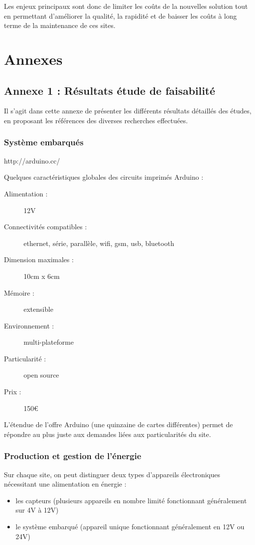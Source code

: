 \documentclass{mise_en_page}
\begin{document}
Les enjeux principaux sont donc de limiter les coûts de la nouvelles
solution tout en permettant d’améliorer la qualité, la rapidité et de
baisser les coûts à long terme de la maintenance de ces sites.




\section{Annexes}
\subsection{Annexe 1 : Résultats étude de faisabilité}
Il s’agit dans cette annexe de présenter les différents résultats
détaillés des études, en proposant les références des diverses
recherches effectuées.

\subsubsection{Système embarqués}
http://arduino.cc/

Quelques caractéristiques globales des circuits imprimés Arduino :

\begin{description}
\item[Alimentation :] 12V
\item[Connectivités compatibles :] ethernet, série, parallèle, wifi, gsm,
usb, bluetooth
\item[Dimension maximales :] 10cm x 6cm
\item[Mémoire :] extensible
\item[Environnement :] multi-plateforme
\item[Particularité :] open source
\item[Prix :] 150€
\end{description}



L’étendue de l’offre Arduino (une quinzaine de cartes différentes)
permet de répondre au plus juste aux demandes liées aux particularités
du site.

\subsubsection{Production et gestion de l’énergie}
Sur chaque site, on peut distinguer deux types d’appareils électroniques
nécessitant une alimentation en énergie :
\begin{itemize}
\item les capteurs (plusieurs appareils en nombre limité fonctionnant
généralement sur 4V à 12V)
\item le système embarqué (appareil unique fonctionnant généralement en
12V ou 24V)
\end{itemize}
\end{document}
